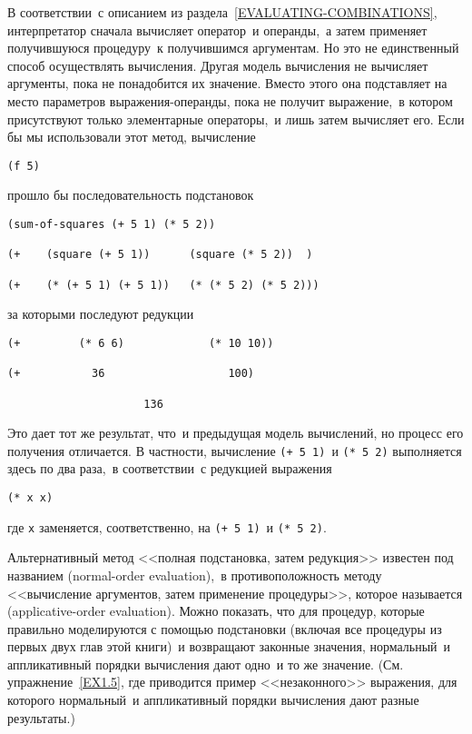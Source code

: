 В соответствии~с описанием из раздела~\ref{EVALUATING-COMBINATIONS}, интерпретатор
сначала вычисляет оператор~и операнды,~а затем применяет получившуюся
процедуру~к получившимся аргументам.  Но это не единственный способ
осуществлять вычисления.  Другая модель вычисления не вычисляет
аргументы, пока не понадобится их значение.
Вместо этого она подставляет на место параметров выражения-операнды,
пока не получит выражение,~в котором присутствуют только элементарные
операторы,~и лишь затем вычисляет его.  Если бы мы
использовали этот метод, вычисление

\begin{Verbatim}[fontsize=\small]
(f 5)
\end{Verbatim}
прошло бы последовательность подстановок

\begin{Verbatim}[fontsize=\small]
(sum-of-squares (+ 5 1) (* 5 2))

(+    (square (+ 5 1))      (square (* 5 2))  )

(+    (* (+ 5 1) (+ 5 1))   (* (* 5 2) (* 5 2)))
\end{Verbatim}
за которыми последуют редукции

\begin{Verbatim}[fontsize=\small]
(+         (* 6 6)             (* 10 10))

(+           36                   100)

                     136
\end{Verbatim}
Это дает тот же результат, что~и предыдущая модель вычислений, но
процесс его получения отличается. В частности, вычисление
{\tt (+ 5 1)}~и {\tt (* 5 2)}
выполняется здесь по два раза,~в соответствии~с редукцией выражения

\begin{Verbatim}[fontsize=\small]
(* x x)
\end{Verbatim}
где {\tt x} заменяется, соответственно, на {\tt (+ 
5 1)}~и {\tt (* 5 2)}.

Альтернативный метод <<полная подстановка, затем
редукция>> известен под названием  (normal-order evaluation),~в противоположность методу <<вычисление
аргументов, затем применение процедуры>>, которое называется
 (ap\-pli\-ca\-tive-order evaluation).
Можно показать, что для процедур, которые правильно моделируются
с помощью подстановки (включая все процедуры из первых
двух глав этой книги)~и возвращают законные значения,
нормальный~и аппликативный порядки вычисления дают одно~и то же
значение. (См. упражнение~\ref{EX1.5}, где приводится пример
<<незаконного>> выражения, для которого нормальный~и аппликативный порядки
вычисления дают разные результаты.)

